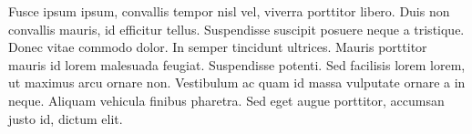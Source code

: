 Fusce ipsum ipsum, convallis tempor nisl vel, viverra porttitor libero. Duis non convallis mauris, id efficitur tellus. Suspendisse suscipit posuere neque a tristique. Donec vitae commodo dolor. In semper tincidunt ultrices. Mauris porttitor mauris id lorem malesuada feugiat. Suspendisse potenti. Sed facilisis lorem lorem, ut maximus arcu ornare non. Vestibulum ac quam id massa vulputate ornare a in neque. Aliquam vehicula finibus pharetra. Sed eget augue porttitor, accumsan justo id, dictum elit. 

